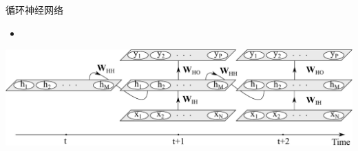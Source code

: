 \begin{xframe}{循环神经网络}

    \begin{itemize}
        \item {}
    \end{itemize}

    \includegraphics[width=\textwidth,totalheight=0.5\textheight]{./style/images/srnn.pdf}

\end{xframe}

